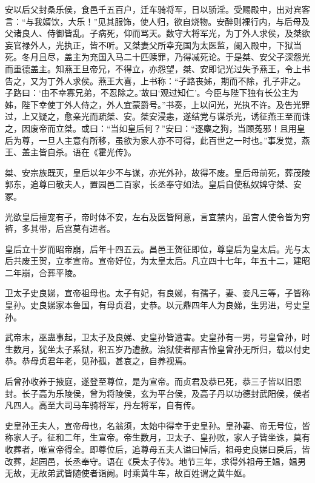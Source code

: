 \documentclass[12pt,UTF8]{ctexbook}
\begin{document}
安以后父封桑乐侯，食邑千五百户，迁车骑将军，日以骄淫。受赐殿中，出对宾客言：“与我婿饮，大乐！”见其服饰，使人归，欲自烧物。安醉则裸行内，与后母及父诸良人、侍御皆乱。子病死，仰而骂天。数守大将军光，为丁外人求侯，及桀欲妄官禄外人，光执正，皆不听。又桀妻父所幸充国为太医监，阑入殿中，下狱当死。冬月且尽，盖主为充国入马二十匹赎罪，乃得减死论。于是桀、安父子深怨光而重德盖主。知燕王旦帝兄，不得立，亦怨望，桀、安即记光过失予燕王，令上书告之，又为丁外人求侯。燕王大喜，上书称：“子路丧姊，期而不除，孔子非之。子路曰：‘由不幸寡兄弟，不忍除之。’故曰‘观过知仁’。今臣与陛下独有长公主为姊，陛下幸使丁外人侍之，外人宜蒙爵号。”书奏，上以问光，光执不许。及告光罪过，上又疑之，愈亲光而疏桀、安。桀安浸恚，遂结党与谋杀光，诱征燕王至而诛之，因废帝而立桀。或曰：“当如皇后何？”安曰：“逐麋之狗，当顾菟邪！且用皇后为尊，一旦人主意有所移，虽欲为家人亦不可得，此百世之一时也。”事发觉，燕王、盖主皆自杀。语在《霍光传》。



桀、安宗族既灭，皇后以年少不与谋，亦光外孙，故得不废。皇后母前死，葬茂陵郭东，追尊曰敬夫人，置园邑二百家，长丞奉守如法。皇后自使私奴婢守桀、安冢。



光欲皇后擅宠有子，帝时体不安，左右及医皆阿意，言宜禁内，虽宫人使令皆为穷裤，多其带，后宫莫有进者。



皇后立十岁而昭帝崩，后年十四五云。昌邑王贺征即位，尊皇后为皇太后。光与太后共废王贺，立孝宣帝。宣帝好位，为太皇太后。凡立四十七年，年五十二，建昭二年崩，合葬平陵。



卫太子史良娣，宣帝祖母也。太子有妃，有良娣，有孺子，妻、妾凡三等，子皆称皇孙。史良娣家本鲁国，有母贞君，史恭。以元鼎四年人为良娣，生男进，号史皇孙。



武帝末，巫蛊事起，卫太子及良娣、史皇孙皆遭害。史皇孙有一男，号皇曾孙，时生数月，犹坐太子系狱，积五岁乃遭赦。治狱使者邴吉怜皇曾孙无所归，载以付史恭。恭母贞君年老，见孙孤，甚哀之，自养视焉。



后曾孙收养于掖庭，遂登至尊位，是为宣帝。而贞君及恭已死，恭三子皆以旧恩封。长子高为乐陵侯，曾为将陵侯，玄为平台侯，及高子丹以功德封武阳侯，侯者凡四人。高至大司马车骑将军，丹左将军，自有传。



史皇孙王夫人，宣帝母也，名翁须，太始中得幸于史皇孙。皇孙妻、帝无号位，皆称家人子。征和二年，生宣帝。帝生数月，卫太子、皇孙败，家人子皆坐诛，莫有收葬者，唯宣帝得全。即尊位后，追尊母五夫人谥曰悼后，祖母史良娣曰戾后，皆改葬，起园邑，长丞奉守。语在《戾太子传》。地节三年，求得外祖母王媪，媪男无故，无故弟武皆随使者诣阙。时乘黄牛车，故百姓谓之黄牛妪。
\end{document}
